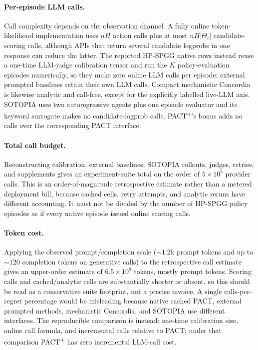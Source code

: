 \paragraph{Per-episode LLM calls.} Call complexity depends on the observation channel. A fully online token-likelihood implementation uses $nH$ action calls plus at most $nH|\Theta_i|$ candidate-scoring calls, although APIs that return several candidate logprobs in one response can reduce the latter. The reported HP-SPGG native rows instead reuse a one-time LLM-judge calibration tensor and run the $K$ policy-evaluation episodes numerically, so they make zero online LLM calls per episode; external prompted baselines retain their own LLM calls. Compact mechanistic Concordia is likewise analytic and call-free, except for the explicitly labelled live-LLM axis. SOTOPIA uses two autoregressive agents plus one episode evaluator and its keyword surrogate makes no candidate-logprob calls. PACT\textsuperscript{+}'s bonus adds no calls over the corresponding PACT interface.

\paragraph{Total call budget.} Reconstructing calibration, external baselines, SOTOPIA rollouts, judges, retries, and supplements gives an experiment-suite total on the order of $5{\times}10^5$ provider calls. This is an order-of-magnitude retrospective estimate rather than a metered deployment bill, because cached cells, retry attempts, and analytic reruns have different accounting. It must not be divided by the number of HP-SPGG policy episodes as if every native episode issued online scoring calls.

\paragraph{Token cost.} Applying the observed prompt/completion scale ($\sim1.2$k prompt tokens and up to $\sim120$ completion tokens on generative calls) to the retrospective call estimate gives an upper-order estimate of $6.5{\times}10^8$ tokens, mostly prompt tokens. Scoring calls and cached/analytic cells are substantially shorter or absent, so this should be read as a conservative suite footprint, not a precise invoice. A single calls-per-regret percentage would be misleading because native cached PACT, external prompted methods, mechanistic Concordia, and SOTOPIA use different interfaces. The reproducible comparison is instead: one-time calibration size, online call formula, and incremental calls relative to PACT; under that comparison PACT\textsuperscript{+} has zero incremental LLM-call cost.

